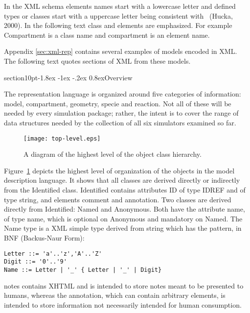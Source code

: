 \documentclass[10pt]{article}
\makeatletter
\renewcommand{\section}{\@startsection%
  {section}{1}{0pt}{-1.8ex \@plus -1ex \@minus -.2ex}%
  {0.8ex}{\normalfont\Large\bfseries}}
\newcommand{\class}[1]{\textsf{#1}}
\newcommand{\attrib}[1]{\textsf{#1}}
\makeatother
\begin{document}
In the XML schema elements names start with a lowercase letter
and defined types or classes start with a uppercase letter being
consistent with ~(Hucka, 2000). In the following text class and
elements are emphasized.  For example \class{Compartment} is a
class name and \class{compartment} is an element name.

Appendix \ref{sec:xml-rep} contains several examples of models encoded in XML.
The following text quotes sections of XML from these models.

\section{Overview}
\label{sec:overview}

The representation language is organized around five categories of
information: model, compartment, geometry, specie and reaction.
Not all of these will be needed by every simulation package;
rather, the intent is to cover the range of data structures
needed by the collection of all six simulators examined so far.

\begin{figure}
  \centering
  \texttt{[image: top-level.eps]}
  \caption{A diagram of the highest level of the object class hierarchy.}
  \label{fig:top-level}
\end{figure}

Figure~\ref{fig:top-level} depicts the highest level of
organization of the objects in the model description language. It
shows that all classes are derived directly or indirectly from the
\class{Identified} class.  \class{Identified} contains attributes
\attrib{ID} of type IDREF and of type string, and elements
\attrib{comment} and \attrib{annotation}.  Two classes are
derived directly from \class{Identified}: \class{Named} and
\class{Anonymous}. Both have the attribute \attrib{name}, of type
name, which is optional on \class{Anonymous} and mandatory on
\class{Named}. The \class{Name} type is a XML simple type
derived from string which has the pattern, in BNF
(Backus-Naur Form):

\begin{verbatim}
Letter ::= 'a'..'z','A'..'Z'
Digit ::= '0'..'9'
Name ::= Letter | '_' { Letter | '_' | Digit}
\end{verbatim}

\attrib{notes} contains XHTML and is intended to store notes
meant to be presented to humans, whereas the \attrib{annotation},
which can contain arbitrary elements, is intended to store
information not necessarily intended for human consumption.
\end{document}
